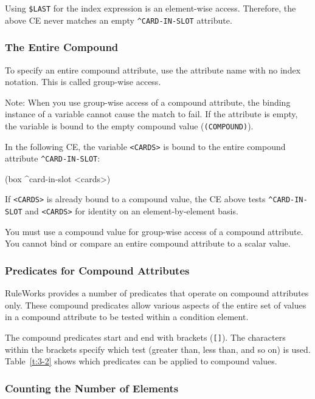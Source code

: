   Using \verb|$LAST| for the index expression is an element-wise
  access. Therefore, the above CE never matches an empty
  \verb|^CARD-IN-SLOT| attribute.

\subsubsection{The Entire Compound}

  To specify an entire compound attribute, use the
  attribute name with no index notation. This is called
  group-wise access.

  Note: When you use group-wise access of a compound
  attribute, the binding instance of a variable cannot
  cause the match to fail. If the attribute is empty, the
  variable is bound to the empty compound value
  (\verb|(COMPOUND)|).

  In the following CE, the variable \verb|<CARDS>| is bound to
  the entire compound attribute \verb|^CARD-IN-SLOT|:
\begin{qv}
(box ^card-in-slot <cards>)
\end{qv}

If \verb|<CARDS>| is already bound to a compound value, the CE above
tests \verb|^CARD-IN-SLOT| and \verb|<CARDS>| for identity on an
element-by-element basis.

You must use a compound value for group-wise access of a compound
attribute. You cannot bind or compare an entire compound attribute to
a scalar value.

\subsubsection{Predicates for Compound Attributes}

RuleWorks provides a number of predicates that operate on compound
attributes only. These compound predicates allow various aspects of
the entire set of values in a compound attribute to be tested within a
condition element.

The compound predicates start and end with brackets (\verb|[]|). The
characters within the brackets specify which test (greater than, less
than, and so on) is used. Table~\ref{t:3-2} shows which predicates can
be applied to compound values.

\subsubsection{Counting the Number of Elements}

